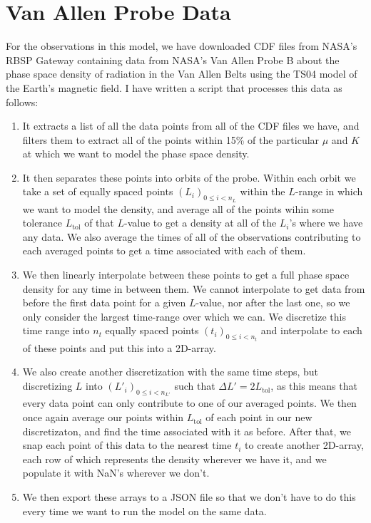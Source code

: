 \documentclass[a4paper, fleqn]{article}
\begin{document}
\section{Van Allen Probe Data}
For the observations in this model, we have downloaded CDF files from NASA's RBSP Gateway containing data from NASA's Van Allen Probe B about the phase space density of radiation in the Van Allen Belts using the TS04 model of the Earth's magnetic field. I have written a script that processes this data as follows:
\begin{enumerate}
    \item It extracts a list of all the data points from all of the CDF files we have, and filters them to extract all of the points within 15\% of the particular $\mu$ and $K$ at which we want to model the phase space density.
    \item It then separates these points into orbits of the probe. Within each orbit we take a set of equally spaced points $(L_i)_{0\leq i < n_L}$ within the $L$-range in which we want to model the density, and average all of the points wihin some tolerance $L_{\text{tol}}$ of that $L$-value to get a density at all of the $L_i$'s where we have any data. We also average the times of all of the observations contributing to each averaged points to get a time associated with each of them.
    \item We then linearly interpolate between these points to get a full phase space density for any time in between them. We cannot interpolate to get data from before the first data point for a given $L$-value, nor after the last one, so we only consider the largest time-range over which we can. We discretize this time range into $n_t$ equally spaced points $(t_i)_{0 \leq i < n_t}$ and interpolate to each of these points and put this into a 2D-array.
    \item We also create another discretization with the same time steps, but discretizing $L$ into $(L'_i)_{0\leq i < n_{L'}}$ such that $\Delta L'=2L_{\text{tol}}$, as this means that every data point can only contribute to one of our averaged points. We then once again average our points within $L_{\text{tol}}$ of each point in our new discretizaton, and find the time associated with it as before. After that, we snap each point of this data to the nearest time $t_i$ to create another 2D-array, each row of which represents the density wherever we have it, and we populate it with NaN's wherever we don't.
\item We then export these arrays to a JSON file so that we don't have to do this every time we want to run the model on the same data.
\end{enumerate}
\end{document}
